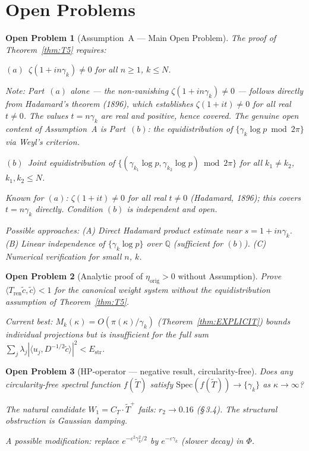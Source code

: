 \documentclass[11pt]{article}
\newtheorem*{openproblem}{Open Problem}
\newcommand{\Estr}{E_{\mathrm{str}}}
\newcommand{\etaorig}{\eta_{\mathrm{orig}}}
\newcommand{\Tren}{T_{\mathrm{ren}}}
\newcommand{\Tt}{\widetilde{T}}
\newcommand{\CT}{C_{T}}
\newcommand{\Wone}{W_1}
\begin{document}
\section{Open Problems}

\begin{openproblem}[Assumption~A --- Main Open Problem]
The proof of Theorem~\ref{thm:T5} requires:

$(a)$~$\zeta(1+in\gamma_k)\neq 0$ for all $n\geq 1$, $k\leq N$.

\emph{Note: Part~$(a)$ alone --- the non-vanishing
$\zeta(1+in\gamma_k)\neq 0$ --- follows directly from
Hadamard's theorem (1896), which establishes
$\zeta(1+it)\neq 0$ for all real $t\neq 0$.
The values $t = n\gamma_k$ are real and positive, hence covered.
The genuine open content of Assumption~A is Part~$(b)$:
the equidistribution of $\{\gamma_k\log p\bmod 2\pi\}$
via Weyl's criterion.}

$(b)$~Joint equidistribution of
$\{(\gamma_{k_1}\log p,\gamma_{k_2}\log p)\bmod 2\pi\}$
for all $k_1\neq k_2$, $k_1,k_2\leq N$.

Known for $(a)$: $\zeta(1+it)\neq 0$ for all real $t\neq 0$
(Hadamard, 1896); this covers $t = n\gamma_k$ directly.
Condition $(b)$ is independent and open.

Possible approaches:
(A) Direct Hadamard product estimate near $s = 1+in\gamma_k$.
(B) Linear independence of $\{\gamma_k\log p\}$ over $\mathbb{Q}$
  (sufficient for $(b)$).
(C) Numerical verification for small $n$, $k$.
\end{openproblem}

\begin{openproblem}[Analytic proof of $\etaorig > 0$ without Assumption]
Prove $\langle\Tren\tilde{c},\tilde{c}\rangle < 1$ for the canonical
weight system without the equidistribution assumption of
Theorem~\ref{thm:T5}.

Current best: $M_k(\kappa) = O(\pi(\kappa)/\gamma_k)$
(Theorem~\ref{thm:EXPLICIT}) bounds individual projections but is
insufficient for the full sum
$\sum_j\lambda_j|\langle u_j, D^{-1/2}\tilde{c}\rangle|^2 < \Estr$.
\end{openproblem}

\begin{openproblem}[HP-operator --- negative result, circularity-free]
Does any circularity-free spectral function $f(\Tt)$ satisfy
$\mathrm{Spec}(f(\Tt))\to\{\gamma_k\}$ as $\kappa\to\infty$?

The natural candidate $\Wone = \CT\cdot\Tt^+$ fails: $r_2\to 0.16$
(\S\,3.4). The structural obstruction is Gaussian damping.

A possible modification: replace $e^{-\varepsilon^2\gamma_k^2/2}$
by $e^{-\varepsilon\gamma_k}$ (slower decay) in $\Phi$.
\end{openproblem}
\end{document}
